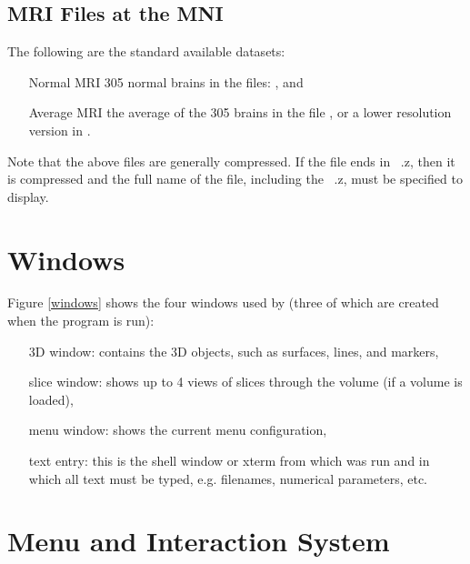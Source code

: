 \subsection{MRI Files at the MNI}

The following are the standard available datasets:

\begin{itemize}
\item[Normal MRI] 305 normal brains in the files:  , and
\item[Average MRI] the average of the 305 brains in the file
, or a lower
resolution version in .
\end{itemize}

Note that the above files are generally compressed.  If the file ends in
\ .z, then it is compressed and the full name of the file, including the
\ .z, must be specified to display.

\section{\display Windows}


Figure \ref{windows} shows the four windows used by \display (three of which
are created when the program is run):

\begin{itemize}
\item[3D window:]  contains the 3D objects, such as surfaces, lines,
                  and markers,
\item[slice window:]  shows up to 4 views of slices through the volume
                      (if a volume is loaded),
\item[menu window:]  shows the current menu configuration,
\item[text entry:]  this is the shell window or xterm from which \display was
                   run and in which all text must be typed, e.g. filenames,
                   numerical parameters, etc.
\end{itemize}

\section{Menu and Interaction System}

